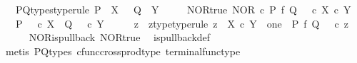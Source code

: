 \begin{isabellebody}
\ \ \ P{\isacharunderscore}{\kern0pt}Q{\isacharunderscore}{\kern0pt}types{\isacharbrackleft}{\kern0pt}type{\isacharunderscore}{\kern0pt}rule{\isacharbrackright}{\kern0pt}{\isacharcolon}{\kern0pt}\ {\isachardoublequoteopen}P\ {\isacharcolon}{\kern0pt}\ X\ {\isasymrightarrow}\ {\isasymOmega}{\isachardoublequoteclose}\ {\isachardoublequoteopen}Q\ {\isacharcolon}{\kern0pt}\ Y\ {\isasymrightarrow}\ {\isasymOmega}{\isachardoublequoteclose}\isanewline
\ \ \ NOR{\isacharunderscore}{\kern0pt}true{\isacharcolon}{\kern0pt}\ {\isachardoublequoteopen}NOR\ {\isasymcirc}\isactrlsub c\ {\isacharparenleft}{\kern0pt}P\ {\isasymtimes}\isactrlsub f\ Q{\isacharparenright}{\kern0pt}\ {\isacharequal}{\kern0pt}\ {\isasymt}\ {\isasymcirc}\isactrlsub c\ {\isasymbeta}\isactrlbsub X\ {\isasymtimes}\isactrlsub c\ Y\isactrlesub {\isachardoublequoteclose}\isanewline
\ \ \ {\isachardoublequoteopen}{\isacharparenleft}{\kern0pt}P\ {\isacharequal}{\kern0pt}\ {\isasymf}\ {\isasymcirc}\isactrlsub c\ {\isasymbeta}\isactrlbsub X\isactrlesub {\isacharparenright}{\kern0pt}\ {\isasymand}\ {\isacharparenleft}{\kern0pt}Q\ {\isacharequal}{\kern0pt}\ {\isasymf}\ {\isasymcirc}\isactrlsub c\ {\isasymbeta}\isactrlbsub Y\isactrlesub {\isacharparenright}{\kern0pt}{\isachardoublequoteclose}\isanewline
%
\isadelimproof
%
\endisadelimproof
%
\isatagproof
{}\isamarkupfalse%
\ {\isacharminus}{\kern0pt}\isanewline
\ \ \isamarkupfalse%
\ z\ \ z{\isacharunderscore}{\kern0pt}type{\isacharbrackleft}{\kern0pt}type{\isacharunderscore}{\kern0pt}rule{\isacharbrackright}{\kern0pt}{\isacharcolon}{\kern0pt}\ {\isachardoublequoteopen}z\ {\isacharcolon}{\kern0pt}\ X\ {\isasymtimes}\isactrlsub c\ Y\ {\isasymrightarrow}\ one{\isachardoublequoteclose}\ \ {\isachardoublequoteopen}P\ {\isasymtimes}\isactrlsub f\ Q\ {\isacharequal}{\kern0pt}\ {\isasymlangle}{\isasymf}{\isacharcomma}{\kern0pt}{\isasymf}{\isasymrangle}\ {\isasymcirc}\isactrlsub c\ z{\isachardoublequoteclose}\isanewline
\ \ \ \ \isamarkupfalse%
\ NOR{\isacharunderscore}{\kern0pt}is{\isacharunderscore}{\kern0pt}pullback\ NOR{\isacharunderscore}{\kern0pt}true\ \isamarkupfalse%
\ is{\isacharunderscore}{\kern0pt}pullback{\isacharunderscore}{\kern0pt}def\isanewline
\ \ \ \ \isamarkupfalse%
\ {\isacharparenleft}{\kern0pt}metis\ P{\isacharunderscore}{\kern0pt}Q{\isacharunderscore}{\kern0pt}types\ cfunc{\isacharunderscore}{\kern0pt}cross{\isacharunderscore}{\kern0pt}prod{\isacharunderscore}{\kern0pt}type\ terminal{\isacharunderscore}{\kern0pt}func{\isacharunderscore}{\kern0pt}type{\isacharparenright}{\kern0pt}\ \isanewline

\end{isabellebody}
